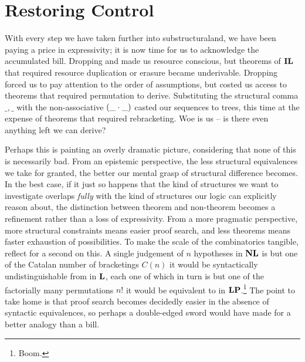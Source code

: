 
\section{Restoring Control}
With every step we have taken further into substructuraland, we have been paying a price in expressivity; it is now time for us to acknowledge the accumulated bill.
Dropping \Contraction{} and \Weakening{} made us resource conscious, but theorems of $\textbf{IL}$ that required resource duplication or erasure became underivable.
Dropping \Exchange{} forced us to pay attention to the order of assumptions, but costed us access to theorems that required permutation to derive.
Substituting the structural comma $\_,\_$ with the non-associative $(\_\cdot\_)$ casted our sequences to trees, this time at the expense of theorems that required rebracketing.
Woe is us -- is there even anything left we can derive?

Perhaps this is painting an overly dramatic picture, considering that none of this is necessarily bad.
From an epistemic perspective, the less structural equivalences we take for granted, the better our mental grasp of structural difference becomes.
In the best case, if it just so happens that the kind of structures we want to investigate overlaps \textit{fully} with the kind of structures our logic can explicitly reason about, the distinction between theorem and non-theorem becomes a refinement rather than a loss of expressivity.
From a more pragmatic perspective, more structural constraints means easier proof search, and less theorems means faster exhaustion of possibilities.
To make the scale of the combinatorics tangible, reflect for a second on this.
A single judgement of $n$ hypotheses in $\textbf{NL}$ is but one of the Catalan number of bracketings $C(n)$ it would be syntactically undistinguishable from in $\textbf{L}$, each one of which in turn is but one of the factorially many permutations $n!$ it would be equivalent to in $\textbf{LP}$.\footnote{Boom.}
The point to take home is that proof search becomes decidedly easier in the absence of syntactic equivalences, so perhaps a double-edged sword would have made for a better analogy than a bill.

